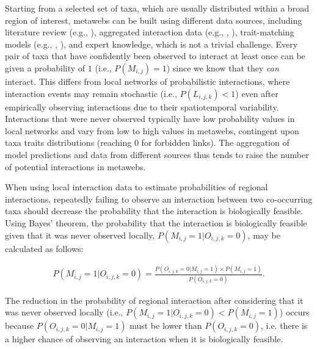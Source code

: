Starting from a selected set of taxa, which are usually distributed within a
broad region of interest, metawebs can be built using different data sources,
including literature review (e.g., \cite{Maiorano2020Tetraeu}), aggregated
interaction data (e.g., \cite{Gravel2019Bringing},
\cite{Saravia2022Ecological}), trait-matching models (e.g.,
\cite{Shaw2024Framework}, \cite{Strydom2022Food}), and expert knowledge, which
is not a trivial challenge. Every pair of taxa that have confidently been
observed to interact at least once can be given a probability of $1$ (i.e.,
$P(M_{i, j}) = 1$) since we know that they \textit{can} interact. This differs
from local networks of probabilistic interactions, where interaction events may
remain stochastic (i.e., $P(L_{i, j, k}) < 1$) even after empirically observing
interactions due to their spatiotemporal variability. Interactions that were
never observed typically have low probability values in local networks and vary
from low to high values in metawebs, contingent upon taxa traits distributions
(reaching $0$ for forbidden links). The aggregation of model predictions and
data from different sources thus tends to raise the number of potential
interactions in metawebs.

When using local interaction data to estimate probabilities of regional
interactions, repeatedly failing to observe an interaction between two
co-occurring taxa should decrease the probability that the interaction is
biologically feasible. Using Bayes' theorem, the probability that the
interaction is biologically feasible given that it was never observed locally,
$P(M_{i, j} = 1 | O_{i, j, k} = 0)$, may be calculated as follows: 

\begin{eqnarray}
  \label{eq:emp_sampling}
  P(M_{i, j} = 1 | O_{i, j, k} = 0) = \frac{P(O_{i, j, k} = 0 |M_{i, j} = 1)
\times P(M_{i, j} = 1)}{P(O_{i, j, k} = 0)}.
\end{eqnarray}

The reduction in the probability of regional interaction after considering that
it was never observed locally (i.e., $P(M_{i, j} = 1 | O_{i, j, k} = 0) <
P(M_{i, j} = 1)$) occurs because $P(O_{i, j, k} = 0 | M_{i, j} = 1)$ must be
lower than $P(O_{i, j, k} = 0)$, i.e. there is a higher chance of observing an
interaction when it is biologically feasible. 


